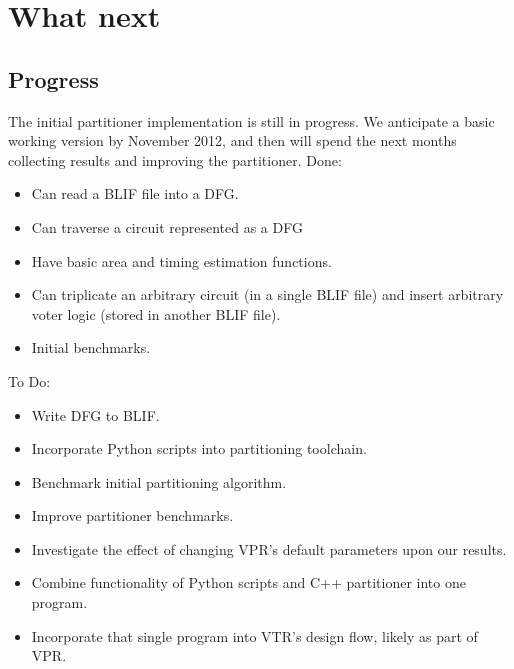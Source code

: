 \documentclass[12pt,final,oneside]{dwThesis} %
\begin{document}
   \chapter{What next}

   \section{Progress}
   The initial partitioner implementation is still in progress. We anticipate a basic working version by November 2012, and then will spend the next months collecting results and improving the partitioner.
   Done:
   \begin{itemize}
      \item Can read a \ac{BLIF} file into a \ac{DFG}.
      \item Can traverse a circuit represented as a \ac{DFG}
      \item Have basic area and timing estimation functions.
      \item Can triplicate an arbitrary circuit (in a single \ac{BLIF} file) and insert arbitrary voter logic (stored in another \ac{BLIF} file).
      \item Initial benchmarks.
   \end{itemize}
   To Do:
   \begin{itemize}
      \item Write \ac{DFG} to \ac{BLIF}.
      \item Incorporate Python scripts into partitioning toolchain.
      \item Benchmark initial partitioning algorithm.
      \item Improve partitioner benchmarks.
      \item Investigate the effect of changing \ac{VPR}'s default parameters upon our results.
      \item Combine functionality of Python scripts and C++ partitioner into one program.
      \item Incorporate that single program into \ac{VTR}'s design flow, likely as part of \ac{VPR}.
   \end{itemize}
\end{document}
